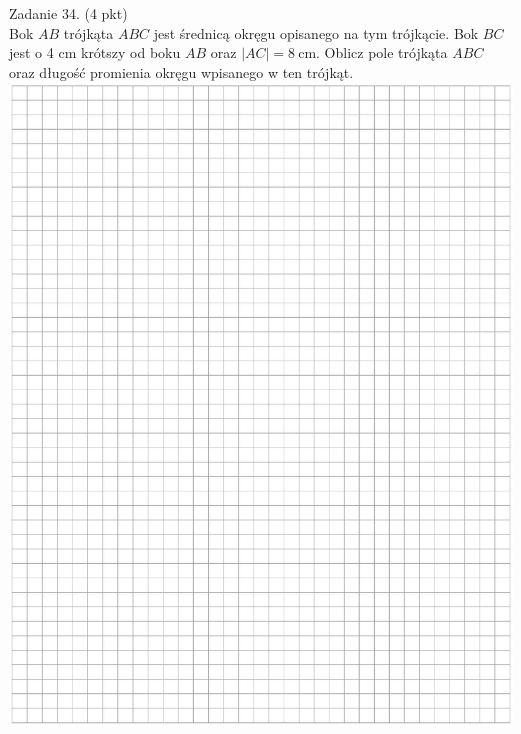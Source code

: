 \documentclass[10pt]{article}
\begin{document}
Zadanie 34. (4 pkt)\\
Bok \(A B\) trójkąta \(A B C\) jest średnicą okręgu opisanego na tym trójkącie. Bok \(B C\) jest o 4 cm krótszy od boku \(A B\) oraz \(|A C|=8 \mathrm{~cm}\). Oblicz pole trójkąta \(A B C\) oraz długość promienia okręgu wpisanego w ten trójkąt.\\
\includegraphics[max width=\textwidth, center]{2024_11_21_23d228cacd5e4a9a3f86g-13}
\end{document}

